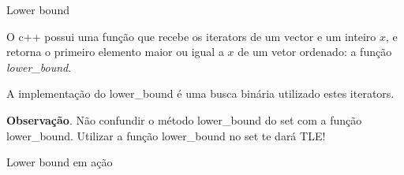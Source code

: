 \begin{frame}{Lower bound}

    O c++ possui uma função que recebe os iterators de um vector e um inteiro $x$, e retorna o primeiro elemento maior ou igual a $x$ de um vetor ordenado: a função \textit{lower\_bound}.

    A implementação do lower\_bound é uma busca binária utilizado estes iterators. \pause

    {\bf Observação}. Não confundir o método lower\_bound do set com a função lower\_bound. Utilizar a função lower\_bound no set te dará TLE! 


    \begin{block}{Lower bound em ação}
        \footnotesize
        \inputminted{cpp}{codigos/lower-bound.cpp}    
    \end{block}

\end{frame}

